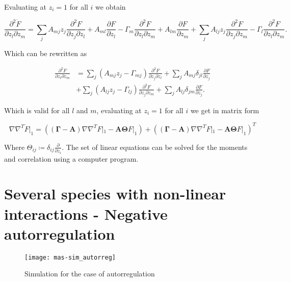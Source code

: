 Evaluating at $z_i=1$ for all $i$ we obtain

\begin{equation}
\frac{\partial^2\dot{F}}{\partial z_l \partial z_m} = \sum_jA_{mj}z_j\frac{\partial^2F}{\partial z_j\partial z_l}+A_{ml}\frac{\partial F}{\partial z_l} - \Gamma_m\frac{\partial^2F}{\partial z_l\partial z_m} + A_{lm}\frac{\partial F}{\partial z_m} + \sum_jA_{lj}z_j\frac{\partial^2F}{\partial z_j\partial z_m}-\Gamma_l\frac{\partial^2F}{\partial z_l\partial z_m}.
\end{equation}

Which can be rewritten as

\begin{equation}
  \begin{split}
    \frac{\partial^2\dot{F}}{\partial z_l \partial z_m} &= \sum_j\left(A_{mj}z_j-\Gamma_{mj}\right)\frac{\partial^2F}{\partial z_j\partial z_l} + \sum_jA_{mj}\delta_{jl}\frac{\partial F}{\partial z_j}\\
&+\sum_j\left(A_{lj}z_j-\Gamma_{lj}\right)\frac{\partial^2F}{\partial z_j\partial z_m} + \sum_jA_{lj}\delta_{jm}\frac{\partial F}{\partial z_j}.
  \end{split}
\end{equation}

Which is valid for all $l$ and $m$, evaluating at $z_i=1$ for all $i$ we get in matrix form


\begin{equation}
  \boxed{\nabla\nabla^T\dot{F}|_1 = \left(\left(\mathbf{\Gamma} - \mathbf{A}\right)\nabla\nabla^TF|_1 - \mathbf{A}\mathbf{\Theta} F|_1\right)+\left(\left(\mathbf{\Gamma} - \mathbf{A}\right)\nabla\nabla^TF|_1 - \mathbf{A}\mathbf{\Theta} F|_1\right)^T}
\end{equation}

Where $\Theta_{ij} \coloneqq \delta_{ij}\frac{\partial}{\partial z_i}$. The set of linear equations can be solved for the moments and correlation using a computer program.

\section{Several species with non-linear interactions - Negative autorregulation}
\label{sec:mas-neg_autorreg}

\begin{figure}[H]
  \centering
  \texttt{[image: mas-sim\_autorreg]}
  \caption[Autorregulation simulation results]{\label{fig:mas-sim_autorreg} Simulation for the case of autorregulation}
\end{figure}
